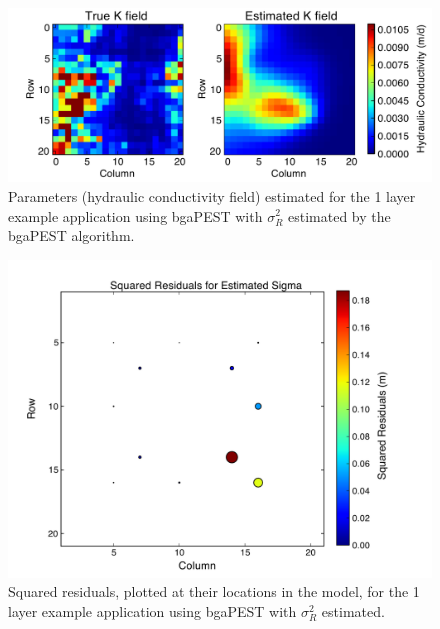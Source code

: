 \documentclass[11pt,oneside,onecolumn]{usgsreport}
\begin{document}
\begin{appendix}
\begin{figure}[H]
\begin{center} \includegraphics[scale=0.7]{figures/1_lay_best_pars_sigma_estimated}\end{center}

\caption{\label{fig:KL1-sigEstimated}Parameters (hydraulic conductivity field)
estimated for the 1 layer example application using bgaPEST with $\sigma_{R}^{2}$
estimated by the bgaPEST algorithm.}
\end{figure}


\begin{figure}[H]
\begin{center} \includegraphics[scale=0.4]{figures/1_layer_estimated_sigma_residuals}\end{center}

\caption{\label{fig:residL1-sigEstimated}Squared residuals, plotted at their
locations in the model, for the 1 layer example application using
bgaPEST with $\sigma_{R}^{2}$ estimated.}
\end{figure}



\end{appendix}
\end{document}
